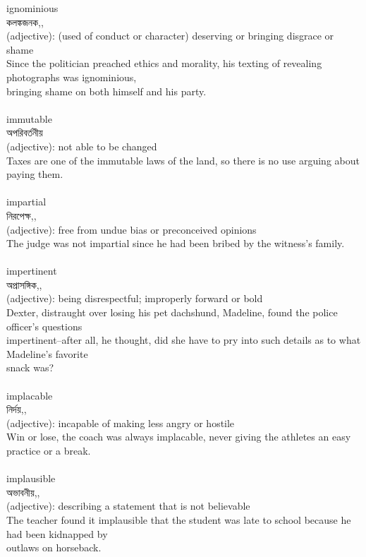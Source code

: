 \documentclass{article}
\begin{document}
{ignominious}\\
{কলঙ্কজনক,,}\\
{(adjective): (used of conduct or character) deserving or bringing disgrace or shame\\Since the politician preached ethics and morality, his texting of revealing photographs was ignominious,\\bringing shame on both himself and his party.\\}\\
{immutable}\\
{অপরিবর্তনীয়}\\
{(adjective): not able to be changed\\Taxes are one of the immutable laws of the land, so there is no use arguing about paying them.\\}\\
{impartial}\\
{নিরপেক্ষ,,}\\
{(adjective): free from undue bias or preconceived opinions\\The judge was not impartial since he had been bribed by the witness's family.\\}\\
{impertinent}\\
{অপ্রাসঙ্গিক,,}\\
{(adjective): being disrespectful; improperly forward or bold\\Dexter, distraught over losing his pet dachshund, Madeline, found the police officer's questions\\impertinent--after all, he thought, did she have to pry into such details as to what Madeline's favorite\\snack was?\\}\\
{implacable}\\
{নির্দয়,,}\\
{(adjective): incapable of making less angry or hostile\\Win or lose, the coach was always implacable, never giving the athletes an easy practice or a break.\\}\\
{implausible}\\
{অভাবনীয়,,}\\
{(adjective): describing a statement that is not believable\\The teacher found it implausible that the student was late to school because he had been kidnapped by\\outlaws on horseback.\\}\\
\end{document}
